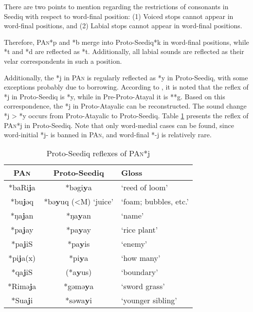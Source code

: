 \documentclass[12pt]{article}
\newcommand{\pan}{\textsc{PAn}\xspace}
\newcommand{\psedf}{Proto-Seediq\xspace}
\begin{document}
There are two points to mention regarding the restrictions of consonants in Seediq with respect to word-final position: (1) Voiced stops cannot appear in word-final positions, and (2) Labial stops cannot appear in word-final positions.

Therefore, \pan *p and *b merge into \psedf *k in word-final positions, while *t and *d are reflected as *t. Additionally, all labial sounds are reflected as their velar correspondents in such a position.

Additionally, the *j in \pan is regularly reflected as *y in \psedf, with some exceptions probably due to borrowing. According to \textcite{song2023Aicgprime}, it is noted that the reflex of *j in \psedf is *y, while in Pre-Proto-Atayal it is **g. Based on this correspondence, the *j in Proto-Atayalic can be reconstructed. The sound change *j > *y occurs from Proto-Atayalic to \psedf. Table \ref{tab:panjref} presents the reflex of \pan *j in \psedf. Note that only word-medial cases can be found, since word-initial *j- is banned in \pan, and word-final *-j is relatively rare. 

\begin{table}[!htbp]
\centering
\caption{\psedf reflexes of \pan *j}
\label{tab:panjref}
\begin{tabular}{ccl}
\hline
\pan              & \psedf                       & Gloss                 \\ \hline
*baRi\textbf{j}a  & *bəgi\textbf{y}a             & `reed of loom'        \\
*bu\textbf{j}əq   & *bə\textbf{y}uq (<M) `juice' & `foam; bubbles, etc.' \\
*ŋa\textbf{j}an   & *ŋa\textbf{y}an              & `name'                \\
*pa\textbf{j}ay   & *pa\textbf{y}ay              & `rice plant'          \\
*pa\textbf{j}iS   & *pa\textbf{y}is              & `enemy'               \\
*pi\textbf{j}a(x) & *pi\textbf{y}a               & `how many'            \\
*qa\textbf{j}iS   & (*a\textbf{y}us)             & `boundary'            \\
*Rimə\textbf{j}a  & *gəmə\textbf{y}a             & `sword grass'         \\
*Sua\textbf{j}i   & *səwa\textbf{y}i             & `younger sibling'     \\ \hline
\end{tabular}
\end{table}
\end{document}
